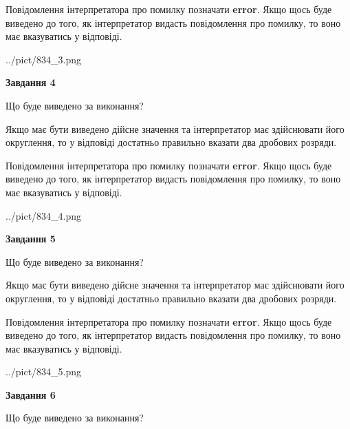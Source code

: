 \documentclass[12pt, ukrainian]{article}
\begin{document}
{\begin {Large}
Повідомлення інтерпретатора про помилку позначати \textbf{error}.
Якщо щось буде виведено до того, як інтерпретатор видасть повідомлення про помилку, 
то воно має вказуватись у відповіді. \par

\begin{center}
	{../pict/834_3.png}
\end{center}
\newpage

{\begin {center}\textbf{Завдання 4}\end {center}}\par
Що буде виведено за виконання? \par

Якщо має бути виведено дійсне значення та інтерпретатор має здійснювати його округлення, 
то у відповіді достатньо правильно вказати два дробових розряди.

Повідомлення інтерпретатора про помилку позначати \textbf{error}.
Якщо щось буде виведено до того, як інтерпретатор видасть повідомлення про помилку, 
то воно має вказуватись у відповіді. \par

\begin{center}
	{../pict/834_4.png}
\end{center}
\newpage

{\begin {center}\textbf{Завдання 5}\end {center}}\par
Що буде виведено за виконання? \par

Якщо має бути виведено дійсне значення та інтерпретатор має здійснювати його округлення, 
то у відповіді достатньо правильно вказати два дробових розряди.

Повідомлення інтерпретатора про помилку позначати \textbf{error}.
Якщо щось буде виведено до того, як інтерпретатор видасть повідомлення про помилку, 
то воно має вказуватись у відповіді. \par

\begin{center}
	{../pict/834_5.png}
\end{center}
\newpage

{\begin {center}\textbf{Завдання 6}\end {center}}\par
Що буде виведено за виконання? \par


\end{Large}}
\end{document}
